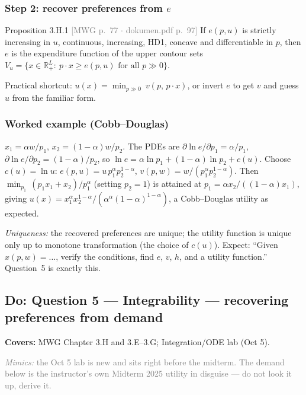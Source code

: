 \documentclass[11pt]{article}
\newcommand{\R}{\mathbb{R}}
\newcommand{\mwg}[2]{\hfill{\small\textcolor{gray}{[MWG p.~#1 $\cdot$ dokumen.pdf p.~#2]}}}
\newcommand{\covers}[1]{\par\noindent\textcolor{blue!60!black}{\small\textbf{Covers:} #1}\medskip}
\newcommand{\mimic}[1]{\par\noindent\textcolor{gray}{\small\textit{Mimics:} #1}\medskip}
\begin{document}
\subsubsection*{Step 2: recover preferences from $e$}
\begin{prop}{Proposition 3.H.1 \mwg{77}{97}}
If $e(p,u)$ is strictly increasing in $u$, continuous, increasing, HD1, concave and differentiable in $p$, then $e$ is the expenditure function of the upper contour sets
$V_u=\{x\in\R^L_+:\ p\cdot x\ge e(p,u)\text{ for all }p\gg0\}$.
\end{prop}
Practical shortcut: $u(x)=\min_{p\gg0}\ v(p,\,p\cdot x)$, or invert $e$ to get $v$ and guess $u$ from the familiar form.

\subsubsection*{Worked example (Cobb--Douglas)}
$x_1=\alpha w/p_1$, $x_2=(1-\alpha)w/p_2$. The PDEs are $\partial\ln e/\partial p_1=\alpha/p_1$, $\partial\ln e/\partial p_2=(1-\alpha)/p_2$, so $\ln e=\alpha\ln p_1+(1-\alpha)\ln p_2+c(u)$. Choose $c(u)=\ln u$: $e(p,u)=u\,p_1^\alpha p_2^{1-\alpha}$, $v(p,w)=w/(p_1^\alpha p_2^{1-\alpha})$. Then
$\min_{p_1}\,(p_1x_1+x_2)/p_1^\alpha$ (setting $p_2=1$) is attained at $p_1=\alpha x_2/((1-\alpha)x_1)$, giving $u(x)=x_1^\alpha x_2^{1-\alpha}/(\alpha^\alpha(1-\alpha)^{1-\alpha})$, a Cobb--Douglas utility as expected.

\begin{exam}
\emph{Uniqueness:} the recovered preferences are unique; the utility function is unique only up to monotone transformation (the choice of $c(u)$). Expect: ``Given $x(p,w)=\dots$, verify the conditions, find $e$, $v$, $h$, and a utility function.'' Question~5 is exactly this.
\end{exam}

\subsection{Do: Question 5 --- Integrability --- recovering preferences from demand}
\covers{MWG Chapter 3.H and 3.E--3.G; Integration/ODE lab (Oct 5).}
\mimic{the Oct 5 lab is new and sits right before the midterm. The demand below is the instructor's own Midterm 2025 utility in disguise --- do not look it up, derive it.}
\end{document}
